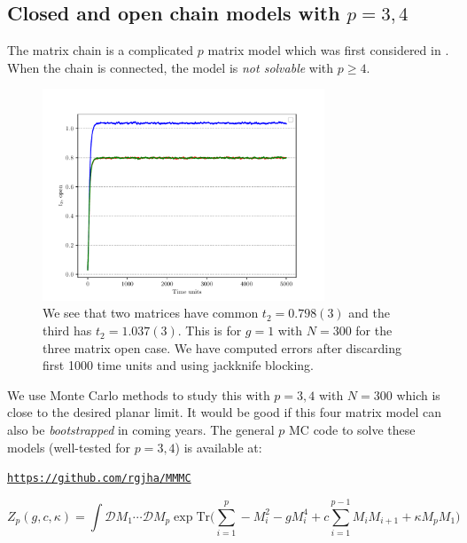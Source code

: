 \documentclass[11pt]{article}
\begin{document}
\subsection{\label{subsection:Mchain}Closed and open chain models with $p = 3, 4$}

The matrix chain is a complicated $p$ matrix model which was first 
considered in \cite{Chadha:1980ri}. When the chain is connected, the 
model is \emph{not solvable} with $p \ge 4$. 

\begin{figure}[htbp] 
	\centering 
	\includegraphics[width=0.75\textwidth]{figs/3MM_open.pdf}
	\caption{\label{fig:3MM_open}We see that two matrices have common $t_{2} = 0.798(3)$ and the third has 
	$t_{2} = 1.037(3)$. This is for $g=1$ with $N=300$ for the three matrix open case. We have computed errors after discarding first 1000 time units and 
	using jackknife blocking.}
\end{figure}

We use Monte Carlo methods to study this with $p = 3,4$ with 
$N = 300$ which is close to the desired planar limit. 
It would be good if this four matrix model can 
also be \textit{bootstrapped} in coming years. 
The general $p$ MC code to solve these models 
(well-tested for $p = 3,4$) is available at: 
\begin{center} \texttt{\href{https://github.com/rgjha/MMMC}{https://github.com/rgjha/MMMC}} \end{center}
\begin{equation}
	\label{eq:Mehta1} 
	Z_{p}(g,c,\kappa) = \int \mathcal{D}M_{1} \cdots  \mathcal{D}M_{p} \exp \mbox{Tr} \Bigg(\sum_{i=1}^{p} -M_{i}^2  - g M_{i}^{4} + c \sum_{i=1}^{p-1} M_{i}M_{i+1} 
	+ \kappa M_{p}M_{1} \Bigg)
\end{equation}
\end{document}
